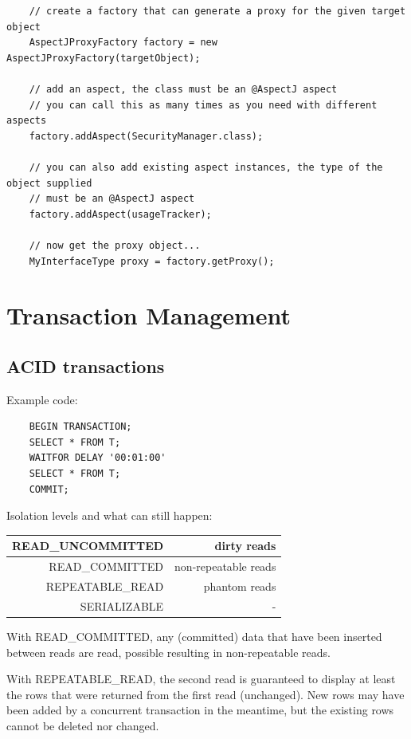 \documentclass{scrartcl}
\begin{document}
\begin{lstlisting}
    // create a factory that can generate a proxy for the given target object
    AspectJProxyFactory factory = new AspectJProxyFactory(targetObject);

    // add an aspect, the class must be an @AspectJ aspect
    // you can call this as many times as you need with different aspects
    factory.addAspect(SecurityManager.class);

    // you can also add existing aspect instances, the type of the object supplied
    // must be an @AspectJ aspect
    factory.addAspect(usageTracker);

    // now get the proxy object...
    MyInterfaceType proxy = factory.getProxy();
\end{lstlisting}

\section{Transaction Management}

\subsection{ACID transactions}

Example code:

\begin{lstlisting}
    BEGIN TRANSACTION;
    SELECT * FROM T;
    WAITFOR DELAY '00:01:00'
    SELECT * FROM T;
    COMMIT;
\end{lstlisting}

Isolation levels and what can still happen:

\begin{table}
\begin{tabular}{|r|r|}
    \hline
    READ\_UNCOMMITTED&  dirty reads\\
    \hline
    READ\_COMMITTED&  non-repeatable reads\\
    \hline
    REPEATABLE\_READ& phantom reads \\
    \hline
    SERIALIZABLE&  -\\
    \hline
\end{tabular}
\end{table}

With READ\_COMMITTED, any (committed) data that have been inserted between reads are read, possible resulting in non-repeatable reads.

With REPEATABLE\_READ, the second read is guaranteed to display at least the rows that were returned from the first read (unchanged). New rows may have been added by a concurrent transaction in the meantime, but the existing rows cannot be deleted nor changed.
\end{document}
